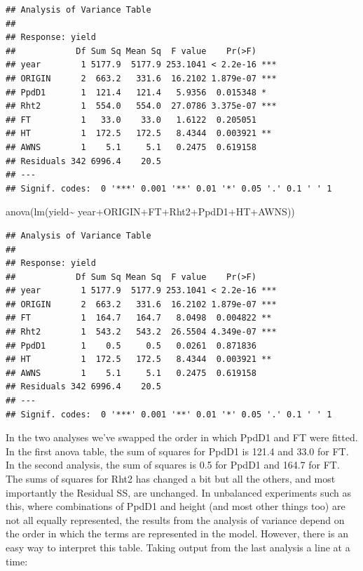 \documentclass[
]{book}
\newenvironment{Shaded}{\begin{snugshade}}{\end{snugshade}}
\newcommand{\FunctionTok}[1]{\textcolor[rgb]{0.00,0.00,0.00}{#1}}
\newcommand{\NormalTok}[1]{#1}
\newcommand{\SpecialCharTok}[1]{\textcolor[rgb]{0.00,0.00,0.00}{#1}}
\begin{document}
\begin{verbatim}
## Analysis of Variance Table
## 
## Response: yield
##            Df Sum Sq Mean Sq  F value    Pr(>F)    
## year        1 5177.9  5177.9 253.1041 < 2.2e-16 ***
## ORIGIN      2  663.2   331.6  16.2102 1.879e-07 ***
## PpdD1       1  121.4   121.4   5.9356  0.015348 *  
## Rht2        1  554.0   554.0  27.0786 3.375e-07 ***
## FT          1   33.0    33.0   1.6122  0.205051    
## HT          1  172.5   172.5   8.4344  0.003921 ** 
## AWNS        1    5.1     5.1   0.2475  0.619158    
## Residuals 342 6996.4    20.5                       
## ---
## Signif. codes:  0 '***' 0.001 '**' 0.01 '*' 0.05 '.' 0.1 ' ' 1
\end{verbatim}

\begin{Shaded}
\begin{Highlighting}[]
\FunctionTok{anova}\NormalTok{(}\FunctionTok{lm}\NormalTok{(yield}\SpecialCharTok{\textasciitilde{}}\NormalTok{ year}\SpecialCharTok{+}\NormalTok{ORIGIN}\SpecialCharTok{+}\NormalTok{FT}\SpecialCharTok{+}\NormalTok{Rht2}\SpecialCharTok{+}\NormalTok{PpdD1}\SpecialCharTok{+}\NormalTok{HT}\SpecialCharTok{+}\NormalTok{AWNS))}
\end{Highlighting}
\end{Shaded}

\begin{verbatim}
## Analysis of Variance Table
## 
## Response: yield
##            Df Sum Sq Mean Sq  F value    Pr(>F)    
## year        1 5177.9  5177.9 253.1041 < 2.2e-16 ***
## ORIGIN      2  663.2   331.6  16.2102 1.879e-07 ***
## FT          1  164.7   164.7   8.0498  0.004822 ** 
## Rht2        1  543.2   543.2  26.5504 4.349e-07 ***
## PpdD1       1    0.5     0.5   0.0261  0.871836    
## HT          1  172.5   172.5   8.4344  0.003921 ** 
## AWNS        1    5.1     5.1   0.2475  0.619158    
## Residuals 342 6996.4    20.5                       
## ---
## Signif. codes:  0 '***' 0.001 '**' 0.01 '*' 0.05 '.' 0.1 ' ' 1
\end{verbatim}

In the two analyses we've swapped the order in which PpdD1 and FT were fitted. In the first anova table, the sum of squares for PpdD1 is 121.4 and 33.0 for FT. In the second analysis, the sum of squares is 0.5 for PpdD1 and 164.7 for FT. The sums of squares for Rht2 has changed a bit but all the others, and most importantly the Residual SS, are unchanged. In unbalanced experiments such as this, where combinations of PpdD1 and height (and most other things too) are not all equally represented, the results from the analysis of variance depend on the order in which the terms are represented in the model. However, there is an easy way to interpret this table. Taking output from the last analysis a line at a time:
\end{document}
